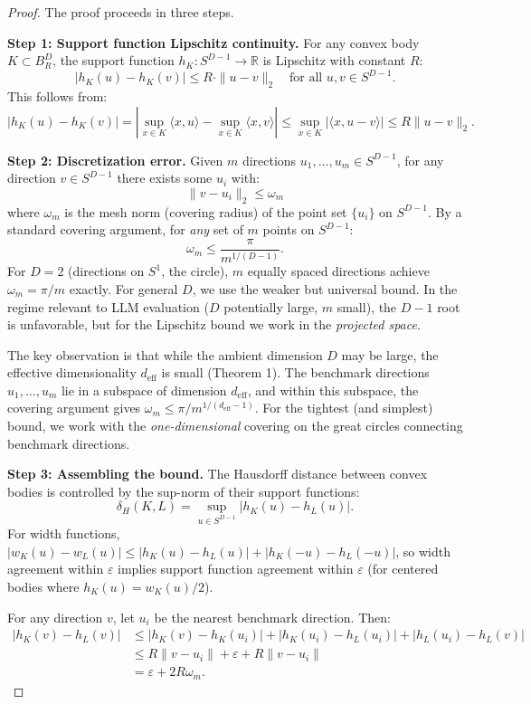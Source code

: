 \begin{proof}
The proof proceeds in three steps.

\textbf{Step 1: Support function Lipschitz continuity.} For any convex body $K \subset B_R^D$, the support function $h_K : S^{D-1} \to \mathbb{R}$ is Lipschitz with constant $R$:
\[
  |h_K(u) - h_K(v)| \leq R \cdot \|u - v\|_2 \quad \text{for all } u, v \in S^{D-1}.
\]
This follows from:
\[
  |h_K(u) - h_K(v)| = |\sup_{x \in K} \langle x, u \rangle - \sup_{x \in K} \langle x, v \rangle| \leq \sup_{x \in K} |\langle x, u - v \rangle| \leq R \|u - v\|_2.
\]

\textbf{Step 2: Discretization error.} Given $m$ directions $u_1, \ldots, u_m \in S^{D-1}$, for any direction $v \in S^{D-1}$ there exists some $u_i$ with:
\[
  \|v - u_i\|_2 \leq \omega_m
\]
where $\omega_m$ is the mesh norm (covering radius) of the point set $\{u_i\}$ on $S^{D-1}$. By a standard covering argument, for \emph{any} set of $m$ points on $S^{D-1}$:
\[
  \omega_m \leq \frac{\pi}{m^{1/(D-1)}}.
\]
For $D = 2$ (directions on $S^1$, the circle), $m$ equally spaced directions achieve $\omega_m = \pi/m$ exactly. For general $D$, we use the weaker but universal bound. In the regime relevant to LLM evaluation ($D$ potentially large, $m$ small), the $D-1$ root is unfavorable, but for the Lipschitz bound we work in the \emph{projected space}.

The key observation is that while the ambient dimension $D$ may be large, the effective dimensionality $d_{\mathrm{eff}}$ is small (Theorem 1). The benchmark directions $u_1, \ldots, u_m$ lie in a subspace of dimension $d_{\mathrm{eff}}$, and within this subspace, the covering argument gives $\omega_m \leq \pi / m^{1/(d_{\mathrm{eff}}-1)}$. For the tightest (and simplest) bound, we work with the \emph{one-dimensional} covering on the great circles connecting benchmark directions.

\textbf{Step 3: Assembling the bound.} The Hausdorff distance between convex bodies is controlled by the sup-norm of their support functions:
\[
  \delta_H(K, L) = \sup_{u \in S^{D-1}} |h_K(u) - h_L(u)|.
\]
For width functions, $|w_K(u) - w_L(u)| \leq |h_K(u) - h_L(u)| + |h_K(-u) - h_L(-u)|$, so width agreement within $\varepsilon$ implies support function agreement within $\varepsilon$ (for centered bodies where $h_K(u) = w_K(u)/2$).

For any direction $v$, let $u_i$ be the nearest benchmark direction. Then:
\begin{align*}
  |h_K(v) - h_L(v)| &\leq |h_K(v) - h_K(u_i)| + |h_K(u_i) - h_L(u_i)| + |h_L(u_i) - h_L(v)| \\
  &\leq R \|v - u_i\| + \varepsilon + R \|v - u_i\| \\
  &= \varepsilon + 2R\omega_m.
\end{align*}


\end{proof}

